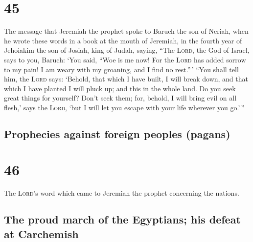 \hypertarget{section-44}{%
\section{45}\label{section-44}}

 The message that Jeremiah the prophet spoke to Baruch the
son of Neriah, when he wrote these words in a book at the mouth of
Jeremiah, in the fourth year of Jehoiakim the son of Josiah, king of
Judah, saying,  ``The \textsc{Lord}, the God of Israel,
says to you, Baruch:  `You said, ``Woe is me now! For the
\textsc{Lord} has added sorrow to my pain! I am weary with my groaning,
and I find no rest.''\,'  ``You shall tell him, the
\textsc{Lord} says: `Behold, that which I have built, I will break down,
and that which I have planted I will pluck up; and this in the whole
land.  Do you seek great things for yourself? Don't seek
them; for, behold, I will bring evil on all flesh,' says the
\textsc{Lord}, `but I will let you escape with your life wherever you
go.'\,''

\hypertarget{prophecies-against-foreign-peoples-pagans}{%
\subsection{Prophecies against foreign peoples
(pagans)}\label{prophecies-against-foreign-peoples-pagans}}

\hypertarget{section-45}{%
\section{46}\label{section-45}}

 The \textsc{Lord}'s word which came to Jeremiah the
prophet concerning the nations.

\hypertarget{the-proud-march-of-the-egyptians-his-defeat-at-carchemish}{%
\subsection{The proud march of the Egyptians; his defeat at
Carchemish}\label{the-proud-march-of-the-egyptians-his-defeat-at-carchemish}}

